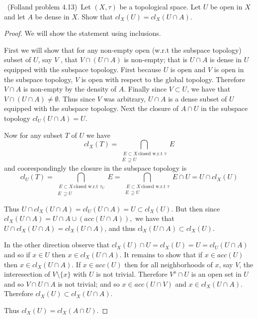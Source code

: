 \documentclass[11pt]{amsart}
\theoremstyle{definition}
\numberwithin{theorem}{section}
\numberwithin{definition}{section}
\numberwithin{equation}{section}
\def\cl{\text{cl}}
\begin{document}
\medskip {}\ (Folland problem 4.13)\ Let $(X, \tau)$ be a topological space. Let $U$ be open in $X$ and let $A$ be dense in $X$. Show that
$cl_X(U) = cl_X(U \cap A).$
\begin{proof}
	We will show the statement using inclusions.


	First we will show that for any 
	non-empty open (w.r.t the subspace topology) subset of $U$, say $V$ , that $V \cap (U \cap A)$ is non-empty; that is $U \cap A$ is dense in $U$ equipped with the subspace topology. First because $U$ is open and $V$ is open in the subspace topology, $V$ is open with respect to the global topology. Therefore $V \cap A$ is non-empty by the density of $A.$ Finally since $V \subset U$, we have that $V \cap (U \cap A) \neq \emptyset$. Thus since $V$ was arbitrary, $U \cap A$ is a dense subset of $U$ equipped with the subspace topology. Next the closure of $A \cap U$ in the subspace topology $cl_U(U \cap A) = U$.

	Now for any subset $T$ of $U$ we have
	\begin{equation*}
		cl_{X}(T) = \bigcap_{\substack{\ E\subset X\, \text{closed w.r.t } \tau\\ E\,\supseteq U}} E
	\end{equation*}
	and coorespondingly the closure in the subspace topology is
	$$cl_U(T) = \bigcap_{\substack{\ E\subset X\, \text{closed w.r.t } \tau_U\\ E\,\supseteq U}} E =
	\bigcap_{\substack{\ E\subset X\, \text{closed w.r.t } \tau\\ E\,\supseteq U}} E\cap U = U \cap cl_X(U)$$

	Thus $U \cap cl_X(U \cap A) = cl_U(U \cap A) = U \subset cl_X(U).$ But then since $cl_X(U \cap A) = U \cap A \cup (acc(U \cap A)), $ we have that $U \cap cl_X(U \cap A) = cl_X(U\cap A)$, and thus $\cl_X(U \cap A) \subset cl_X(U).$ 

	In the other direction observe that $cl_X(U) \cap U = cl_X(U) = U = cl_U(U \cap A)$ and so if $x \in U$ then $x \in cl_X(U\cap A).$ It remains to show that if $x \in acc(U)$ then $x \in cl_X(U \cap A).$
	If $x \in acc(U)$ then for all neighborhoods of $x$, say $V$, the interesection of $V \setminus \{x\}$ with $U$ is not trivial. Therefore $V^o \cap U$ is an open set in $U$ and so $V \cap U \cap A$ is not trivial; and so $x \in acc(U \cap V)$ and $x \in cl_X(U \cap A).$
	Therefore $cl_X(U) \subset cl_X(U \cap A).$

	Thus $cl_X(U) = cl_X(A \cap U).$
\end{proof}
\end{document}
